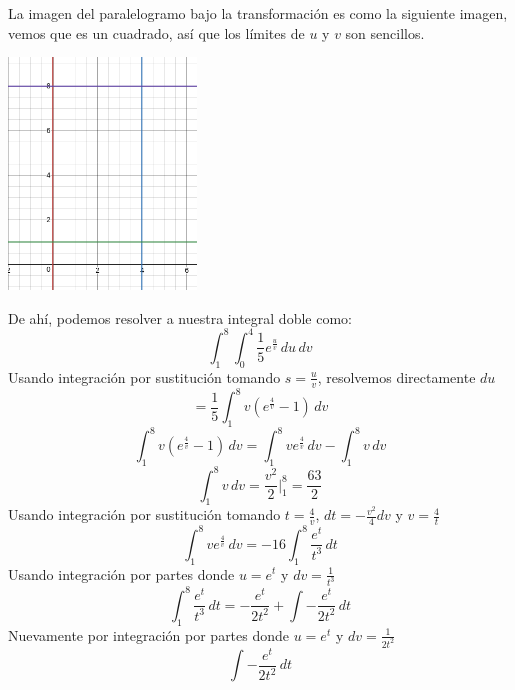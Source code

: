 \documentclass{article}
\begin{document}
\begin{enumerate}
{             La imagen del paralelogramo bajo la transformación es como la
             siguiente imagen, vemos que es un cuadrado, así que los límites
             de $u$ y $v$ son sencillos.
             \begin{center}
                 \includegraphics[width=5cm]{img/ejercicio2-1.png}
         	\end{center}
             De ahí, podemos resolver a nuestra integral doble como:
             \[
                \int_{1}^{8}{
                    \int_{0}^{4}{
                        \frac{1}{5} e^{\frac{u}{v}}
                    \,du}
                \,dv}
            \]
             Usando integración por sustitución tomando $s =\frac{u}{v}$,
             resolvemos directamente $du$
             \[
                = \frac{1}{5} \int_{1}^{8}{
                    v\left(e^{\frac{4}{v}} -1\right)
                \,dv}
            \]
            \[
                \int_{1}^{8}{
                    v\left(e^{\frac{4}{v}} -1\right)
                \,dv}
                =
                \int_{1}^{8}{
                    ve^{\frac{4}{v}}
                \,dv}
                -
                \int_{1}^{8}{v\,dv}
            \]
            \[
                \int_{1}^{8}{v\,dv}
                = \frac{v^2}{2}\Big|_1^8
                = \frac{63}{2}
            \]
             Usando integración por sustitución tomando $t =\frac{4}{v}$,
             $dt = -\frac{v^2}{4}dv$ y $v= \frac{4}{t}$
             \[
                \int_{1}^{8}{ve^{\frac{4}{v}}\,dv}
                = -16\int_{1}^{8}{\frac{e^{t}}{t^3}\,dt}
            \]
            Usando integración por partes donde $u = e^t$ y
            $dv = \frac{1}{t^3}$
            \[
                \int_{1}^{8}{\frac{e^{t}}{t^3}\,dt}
                = -\frac{e^t}{2t^2} + \int{-\frac{e^t}{2t^2}\,dt}
            \]
            Nuevamente por integración por partes donde $u = e^t$ y
            $dv = \frac{1}{2t^2}$
            \[
                \int{-\frac{e^t}{2t^2}\,dt}
\]}
\end{enumerate}
\end{document}
